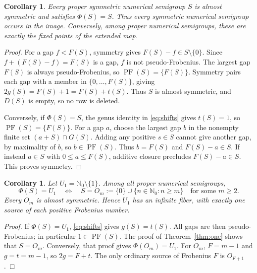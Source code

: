 \documentclass[11pt,a4paper]{article}
\newtheorem{corollary}[theorem]{Corollary}
\theoremstyle{definition}
\theoremstyle{remark}
\newcommand{\N}{\mathbb{N}_0}
\newcommand{\PF}{\operatorname{PF}}
\begin{document}
\begin{corollary}\label{cor:fixed}
Every proper symmetric numerical semigroup $S$ is almost symmetric and
satisfies $\Phi(S)=S$. Thus every symmetric numerical semigroup occurs in
the image. Conversely, among proper numerical semigroups, these are exactly
the fixed points of the extended map.
\end{corollary}
\begin{proof}
For a gap $f<F(S)$, symmetry gives $F(S)-f\in S\setminus\{0\}$.
Since $f+(F(S)-f)=F(S)$ is a gap, $f$ is not pseudo-Frobenius.
The largest gap $F(S)$ is always pseudo-Frobenius, so
$\PF(S)=\{F(S)\}$. Symmetry pairs each gap with a member in
$\{0,\ldots,F(S)\}$, giving $2g(S)=F(S)+1=F(S)+t(S)$.
Thus $S$ is almost symmetric, and $D(S)$ is empty, so no row is deleted.

Conversely, if $\Phi(S)=S$, the genus identity in \eqref{eq:shifts} gives
$t(S)=1$, so $\PF(S)=\{F(S)\}$. For a gap $a$, choose the largest gap
$b$ in the nonempty finite set $(a+S)\cap G(S)$. Adding any positive
$s\in S$ cannot give another gap, by maximality of $b$, so $b\in\PF(S)$.
Thus $b=F(S)$ and $F(S)-a\in S$.
If instead $a\in S$ with $0\leq a\leq F(S)$, additive closure precludes
$F(S)-a\in S$. This proves symmetry.
\end{proof}

\begin{corollary}\label{cor:fiber}
Let $U_1=\N\setminus\{1\}$. Among all proper numerical semigroups,
\[
 \Phi(S)=U_1\quad\Longleftrightarrow\quad
 S=O_m:=\{0\}\cup\{n\in\N:n\geq m\}\quad\text{for some }m\geq2.
\]
Every $O_m$ is almost symmetric. Hence $U_1$ has an infinite fiber, with
exactly one source of each positive Frobenius number.
\end{corollary}
\begin{proof}
If $\Phi(S)=U_1$, \eqref{eq:shifts} gives $g(S)=t(S)$.
All gaps are then pseudo-Frobenius; in particular $1\in\PF(S)$.
The proof of Theorem~\ref{thm:one} shows that $S=O_m$.
Conversely, that proof gives $\Phi(O_m)=U_1$.
For $O_m$, $F=m-1$ and $g=t=m-1$, so $2g=F+t$.
The only ordinary source of Frobenius $F$ is $O_{F+1}$.
\end{proof}
\end{document}
